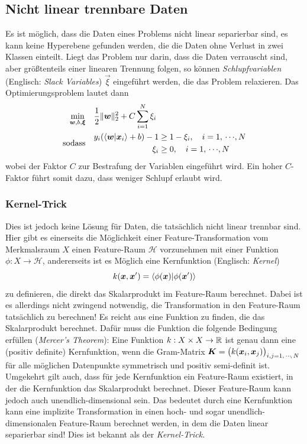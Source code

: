 		\subsection{Nicht linear trennbare Daten}
			Es ist möglich, dass die Daten eines Problems nicht linear separierbar sind, \dh es kann keine Hyperebene gefunden werden, die die Daten ohne Verlust in zwei Klassen einteilt. Liegt das Problem nur darin, dass die Daten verrauscht sind, aber größtenteils einer linearen Trennung folgen, so können \emph{Schlupfvariablen} (Englisch: \emph{Slack Variables}) \(\vec{\xi}\) eingeführt werden, die das Problem relaxieren. Das Optimierungsproblem lautet dann
			\begin{align}
				\min_{\bm{w}, b, \bm{\xi}} \quad& \frac{1}{2} \lVert \bm{w} \rVert_2^2 + C \sum_{i = 1}^{N} \xi_i \\
				\text{sodass} \quad&
				\begin{aligned}
					y_i (\braket{\bm{w}}{\bm{x}_i} + b) - 1 &\geq 1 - \xi_i, \quad i = 1,\,\cdots\!,N \\
					\xi_i &\geq 0, \quad i = 1,\,\cdots\!,N
				\end{aligned}
			\end{align}
			wobei der Faktor \(C\) zur Bestrafung der Variablen eingeführt wird. Ein hoher \(C\)-Faktor führt somit dazu, dass weniger Schlupf erlaubt wird.

			\subsubsection{Kernel-Trick}
				Dies ist jedoch keine Lösung für Daten, die tatsächlich nicht linear trennbar sind. Hier gibt es einerseits die Möglichkeit einer Feature-Transformation vom Merkmalsraum \(X\) einen Feature-Raum \(\mathcal{H}\) vorzunehmen mit einer Funktion \( \phi : X \to \mathcal{H} \), andererseits ist es Möglich eine Kernfunktion (Englisch: \emph{Kernel})
				\begin{equation}
					k(\bm{x}, \bm{x}') = \braket{\phi(\bm{x})}{\phi(\bm{x}')}
				\end{equation}
				zu definieren, die direkt das Skalarprodukt im Feature-Raum berechnet. Dabei ist es allerdings nicht zwingend notwendig, die Transformation in den Feature-Raum tatsächlich zu berechnen! Es reicht aus eine Funktion zu finden, die das Skalarprodukt berechnet. Dafür muss die Funktion die folgende Bedingung erfüllen (\emph{Mercer's Theorem}): Eine Funktion \( k : X \times X \to \mathbb{R} \) ist genau dann eine (positiv definite) Kernfunktion, wenn die Gram-Matrix \( \bm{K} = \big( k(\bm{x}_i, \bm{x}_j) \big)_{i, j = 1,\,\cdots\!,\,N} \) für alle möglichen Datenpunkte symmetrisch und positiv semi-definit ist. Umgekehrt gilt auch, dass für jede Kernfunktion ein Feature-Raum existiert, in der die Kernfunktion das Skalarprodukt berechnet. Dieser Feature-Raum kann jedoch auch unendlich-dimensional sein. Das bedeutet durch eine Kernfunktion kann eine implizite Transformation in einen hoch- und sogar unendlich-dimensionalen Feature-Raum berechnet werden, in dem die Daten linear separierbar sind! Dies ist bekannt als der \emph{Kernel-Trick}.

